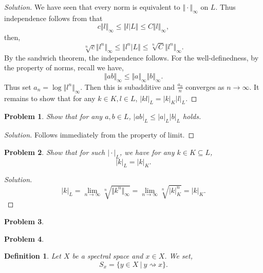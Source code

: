 \documentclass[8pt]{article}
\numberwithin{equation}{section}
\newenvironment{solution}{\begin{proof}[Solution]}{\end{proof}}
\newtheorem{definition}{Definition}[section]
\newtheorem{problem}{Problem}[section]
\newcommand{\norm}[1]{\Vert #1 \Vert}
\newcommand{\sep}[0]{\:|\:}
\newcommand{\ab}[1]{\vert #1 \vert}
\begin{document}
\begin{solution}
  We have seen that every norm is equivalent to $\norm{\cdot}_\infty$ on $L$. Thus independence follows from that 
  \begin{equation*}
    c\norm{l}_\infty\leq \norm{l|L}\leq C\norm{l}_\infty,
  \end{equation*}
  then,
  \begin{equation*}
    \sqrt[n]{c}\norm{l^n}_\infty\leq \norm{l^n|L}\leq \sqrt[n]{C}\norm{l^n}_\infty.
  \end{equation*}
  By the sandwich theorem, the independence follows. For the well-definedness, by the property of norms, recall we have,
  \begin{equation*}
    \norm{ab}_\infty\leq\norm{a}_\infty\norm{b}_\infty.
  \end{equation*}
  Thus set $a_n = \log\norm{l^n}_\infty$. Then this is subadditive and ${\frac {a_n} n}$ converges as $n\to\infty$. It remains to show that for any $k\in K, l\in L$, $\ab{kl}_L = \ab{k}_K\ab{l}_L$.
\end{solution}
\begin{problem}
  Show that for any $a,b\in L$, $\ab{ab}_L\leq\ab{a}_L\ab{b}_L$ holds.
\end{problem}
\begin{solution}
  Follows immediately from the property of limit.
\end{solution}
\begin{problem}
  Show that for such $\ab{\cdot}_L$, we have for any $k\in K\subseteq L$,
  \begin{equation*}
    \ab{k}_L=\ab{k}_K.
  \end{equation*}
\end{problem}
\begin{solution}
  \begin{equation*}
    \ab{k}_L = \lim_{n\to\infty}\sqrt[n]{\norm{k^n}_\infty} = \lim_{n\to\infty}\sqrt[n]{\ab{k}^n_K} = \ab{k}_K.
  \end{equation*}
\end{solution}
\begin{problem}
  
\end{problem}
\begin{problem}
  
\end{problem}
\begin{definition}
  Let $X$ be a spectral space and $x\in X$. We set,
  \begin{equation*}
    S_x = \{y\in X\sep y\rightsquigarrow x\}.
  \end{equation*}
\end{definition}
\end{document}
